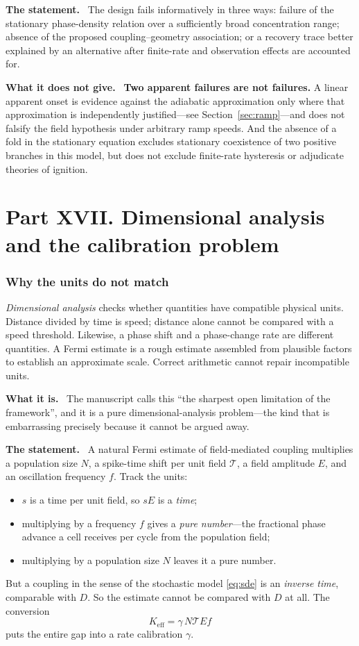 \documentclass[11pt]{article}
\newcommand{\what}{\par\smallskip\noindent\textbf{What it is.}\ }
\newcommand{\statement}{\par\smallskip\noindent\textbf{The statement.}\ }
\newcommand{\scope}{\par\smallskip\noindent\textbf{What it does not give.}\ }
\newcommand{\Keff}{K_{\mathrm{eff}}}
\begin{document}
\statement
The design fails informatively in three ways: failure of the stationary
phase-density relation over a sufficiently broad concentration range; absence
of the proposed coupling--geometry association; or a recovery trace better
explained by an alternative after finite-rate and observation effects are
accounted for.

\scope
\textbf{Two apparent failures are not failures.} A linear apparent onset is
evidence against the adiabatic approximation only where that approximation is
independently justified---see Section~\ref{sec:ramp}---and does not falsify the
field hypothesis under arbitrary ramp speeds. And the absence of a fold in the
stationary equation excludes stationary coexistence of two positive branches in
this model, but does not exclude finite-rate hysteresis or adjudicate theories
of ignition.

\part*{Part XVII. Dimensional analysis and the calibration problem}
\section{Why the units do not match}
\label{sec:gamma}

\emph{Dimensional analysis} checks whether quantities have compatible physical
units. Distance divided by time is speed; distance alone cannot be compared
with a speed threshold. Likewise, a phase shift and a phase-change rate are
different quantities. A Fermi estimate is a rough estimate assembled from
plausible factors to establish an approximate scale. Correct arithmetic cannot
repair incompatible units.

\what
The manuscript calls this ``the sharpest open limitation of the framework'',
and it is a pure dimensional-analysis problem---the kind that is embarrassing
precisely because it cannot be argued away.

\statement
A natural Fermi estimate of field-mediated coupling multiplies a population
size $N$, a spike-time shift per unit field $\mathcal{T}$, a field amplitude $E$, and an
oscillation frequency $f$. Track the units:
\begin{itemize}[leftmargin=*,noitemsep]
\item $s$ is a time per unit field, so $sE$ is a \emph{time};
\item multiplying by a frequency $f$ gives a \emph{pure number}---the
fractional phase advance a cell receives per cycle from the population field;
\item multiplying by a population size $N$ leaves it a pure number.
\end{itemize}
But a coupling in the sense of the stochastic model \eqref{eq:sde} is an
\emph{inverse time}, comparable with $D$. So the estimate cannot be compared
with $D$ at all. The conversion
\[
 \Keff=\gamma\,N \mathcal{T} E f
\]
puts the entire gap into a rate calibration $\gamma$.
\end{document}
